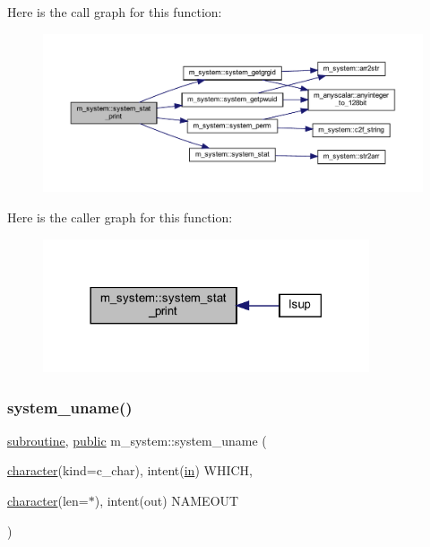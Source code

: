 Here is the call graph for this function\+:
\nopagebreak
\begin{figure}[H]
\begin{center}
\leavevmode
\includegraphics[width=350pt]{namespacem__system_aa26c234da8b559f549db4dbe446b8acc_cgraph}
\end{center}
\end{figure}
Here is the caller graph for this function\+:
\nopagebreak
\begin{figure}[H]
\begin{center}
\leavevmode
\includegraphics[width=273pt]{namespacem__system_aa26c234da8b559f549db4dbe446b8acc_icgraph}
\end{center}
\end{figure}
\mbox{\label{namespacem__system_a04e5d49509c44bcb2ccabfd80ec8cdfb}} 
\subsubsection{\texorpdfstring{system\+\_\+uname()}{system\_uname()}}
{\footnotesize\ttfamily \hyperlink{M__stopwatch_83_8txt_acfbcff50169d691ff02d4a123ed70482}{subroutine}, \hyperlink{M__stopwatch_83_8txt_a2f74811300c361e53b430611a7d1769f}{public} m\+\_\+system\+::system\+\_\+uname (\begin{DoxyParamCaption}\item[{\hyperlink{option__stopwatch_83_8txt_abd4b21fbbd175834027b5224bfe97e66}{character}(kind=c\+\_\+char), intent(\hyperlink{M__journal_83_8txt_afce72651d1eed785a2132bee863b2f38}{in})}]{W\+H\+I\+CH,  }\item[{\hyperlink{option__stopwatch_83_8txt_abd4b21fbbd175834027b5224bfe97e66}{character}(len=$\ast$), intent(out)}]{N\+A\+M\+E\+O\+UT }\end{DoxyParamCaption})}




